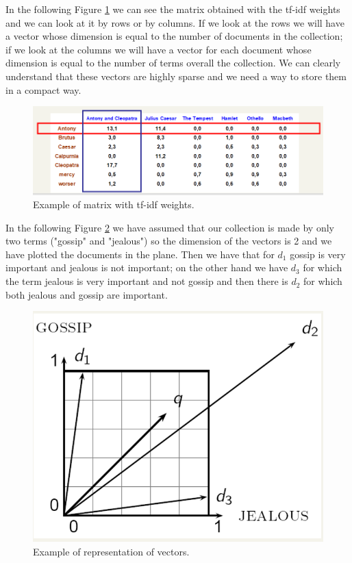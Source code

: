 In the following Figure \ref{fig:tfidf} we can see the matrix obtained with the tf-idf weights and we can look at it by rows or by columns. If we look at the rows we will have a vector whose dimension is equal to the number of documents in the collection; if we look at the columns we will have a vector for each document whose dimension is equal to the number of terms overall the collection. We can clearly understand that these vectors are highly sparse and we need a way to store them in a compact way.\newline
\begin{figure}
    \centering
    \includegraphics[width=0.75\linewidth]{images/tfidf.PNG}
    \caption{Example of matrix with tf-idf weights.}
    \label{fig:tfidf}
\end{figure}
In the following Figure \ref{fig:dimensionstf} we have assumed that our collection is made by only two terms ("gossip" and "jealous") so the dimension of the vectors is 2 and we have plotted the documents in the plane. Then we have that for $d_1$ gossip is very important and jealous is not important; on the other hand we have $d_3$ for which the term jealous is very important and not gossip and then there is $d_2$ for which both jealous and gossip are important.\newline
\begin{figure}
    \centering
    \includegraphics[width=0.75\linewidth]{images/dimensionstf.PNG}
    \caption{Example of representation of vectors.}
    \label{fig:dimensionstf}
\end{figure}
